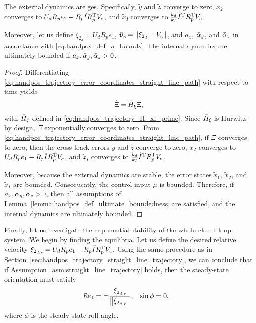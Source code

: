 \begin{prop}
    The external dynamics are \gls{ges}.
    Specifically, $\widetilde{y}$ and $\widetilde{z}$ converge to zero, $x_2$ converges to $U_d R_p e_1 - R_p \tilde{I} R_p^{\mathrm{T}} V_c$, and $\widetilde{x}_I$ converges to $\frac{k_d}{k_I} \hat{I}^{\mathrm{T}} R_p^{\mathrm{T}} V_c$.

    Moreover, let us define $\xi_{2_d} = U_d R_p e_1$, $\Bar{\bm{\upsilon}}_e = \left\|\xi_{2_d} - V_c\right\|$, and $a_x$, $\Bar{\alpha}_y$, and $\Bar{\alpha}_z$ in accordance with \eqref{eq:handpos_def_a_bounds}.
    The internal dynamics are ultimately bounded if $a_x, \Bar{\alpha}_y, \Bar{\alpha}_z > 0$.
    \label{prop:straight_line_path}
\end{prop}
\begin{proof}
    Differentiating \eqref{eq:handpos_trajectory_error_coordinates_straight_line_path} with respect to time yields
    \begin{equation}
        \dot{\Xi} = \Bar{H}_{\xi} \Xi,
    \end{equation}
    with $\Bar{H}_{\xi}$ defined in \eqref{eq:handpos_trajectory_H_xi_prime}.
    Since $\Bar{H}_{\xi}$ is Hurwitz by design, $\Xi$ exponentially converges to zero.
    From \eqref{eq:handpos_trajectory_error_coordinates_straight_line_path}, if $\Xi$ converges to zero, then the cross-track errors $\widetilde{y}$ and $\widetilde{z}$ converge to zero, $x_2$ converges to $U_d R_p e_1 - R_p \tilde{I} R_p^{\mathrm{T}} V_c$, and $\widetilde{x}_I$ converges to $\frac{k_d}{k_I} \hat{I}^{\mathrm{T}} R_p^{\mathrm{T}} V_c$.

    Moreover, because the external dynamics are stable, the error states $\tilde{x}_1$, $\tilde{x}_2$, and $\tilde{x}_I$ are bounded.
    Consequently, the control input $\mu$ is bounded.
    Therefore, if $a_x, \Bar{\alpha}_y, \Bar{\alpha}_z > 0$, then all assumptions of Lemma~\ref{lemma:handpos_def_ultimate_boundedness} are satisfied, and the internal dynamics are ultimately bounded.
\end{proof}

Finally, let us investigate the exponential stability of the whole closed-loop system.
We begin by finding the equilibria.
Let us define the desired relative velocity $\xi_{2_{d, r}} = U_d R_p e_1 - R_p \tilde{I} R_p^{\mathrm{T}} V_c$.
Using the same procedure as in Section~\ref{sec:handpos_trajectory_straight_line_trajectory}, we can conclude that if Assumption~\ref{asm:straight_line_trajectory} holds, then the steady-state orientation must satisfy
\begin{align}
    Re_1 &= \pm \frac{\xi_{2_{d, r}}}{\left\|\xi_{2_{d, r}}\right\|}, &
    \sin\phi &= 0,
\end{align}
where $\phi$ is the steady-state roll angle.

